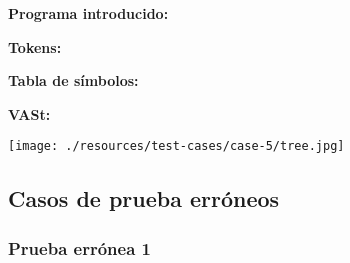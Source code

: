 \documentclass[11pt, , a4paper, titlepage]{article}
\newenvironment{changemargin}[2]{%
\begin{list}{}{%
\setlength{\topsep}{0pt}%
\setlength{\leftmargin}{#1}%
\setlength{\rightmargin}{#2}%
\setlength{\listparindent}{\parindent}%
\setlength{\itemindent}{\parindent}%
\setlength{\parsep}{\parskip}%
}%
\item[]}{\end{list}}
\begin{document}
\begin{changemargin}{+0.5cm}{+0cm}
    \vspace{1mm}                                                                 
    
    \textbf{Programa introducido:}
    \begin{changemargin}{+0.5cm}{+0cm}
        
    \end{changemargin}

    \vspace{2mm}                                                                 

    \textbf{Tokens:}
    \vspace{1mm}                                                                 
    \begin{changemargin}{+0.5cm}{+0cm}
    \end{changemargin}

    \vspace{2mm}                                                                 

    \textbf{Tabla de símbolos:}
    \vspace{1mm}                                                                 
    \begin{changemargin}{+0.5cm}{+0cm}
    \end{changemargin}

    \vspace{2mm}                                                                 
    \clearpage                                                                 

    \textbf{VASt:}
    \vspace{1mm} 
    \begin{center}
        \texttt{[image: ./resources/test-cases/case-5/tree.jpg]}
    \end{center}             

\end{changemargin}


\subsection{Casos de prueba erróneos}

\subsubsection{Prueba errónea 1}
\end{document}
